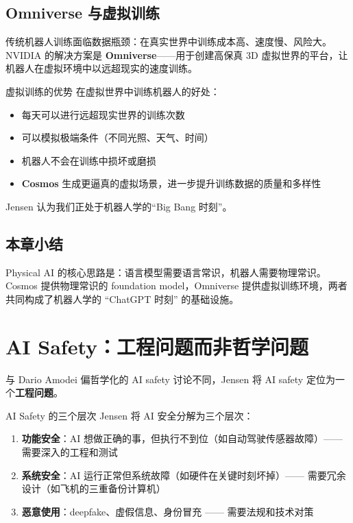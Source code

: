 \documentclass[a4paper]{article}
\begin{document}
\subsection{Omniverse 与虚拟训练}

传统机器人训练面临数据瓶颈：在真实世界中训练成本高、速度慢、风险大。NVIDIA 的解决方案是 \textbf{Omniverse}——用于创建高保真 3D 虚拟世界的平台，让机器人在虚拟环境中以远超现实的速度训练。

\begin{knowledgebox}{虚拟训练的优势}
在虚拟世界中训练机器人的好处：
\begin{itemize}
    \item 每天可以进行远超现实世界的训练次数
    \item 可以模拟极端条件（不同光照、天气、时间）
    \item 机器人不会在训练中损坏或磨损
    \item \textbf{Cosmos} 生成更逼真的虚拟场景，进一步提升训练数据的质量和多样性
\end{itemize}
Jensen 认为我们正处于机器人学的``Big Bang 时刻''。
\end{knowledgebox}

\subsection{本章小结}
Physical AI 的核心思路是：语言模型需要语言常识，机器人需要物理常识。Cosmos 提供物理常识的 foundation model，Omniverse 提供虚拟训练环境，两者共同构成了机器人学的 ``ChatGPT 时刻'' 的基础设施。

\section{AI Safety：工程问题而非哲学问题}

与 Dario Amodei 偏哲学化的 AI safety 讨论不同，Jensen 将 AI safety 定位为一个\textbf{工程问题}。

\begin{importantbox}{AI Safety 的三个层次}
Jensen 将 AI 安全分解为三个层次：
\begin{enumerate}
    \item \textbf{功能安全}：AI 想做正确的事，但执行不到位（如自动驾驶传感器故障）—— 需要深入的工程和测试
    \item \textbf{系统安全}：AI 运行正常但系统故障（如硬件在关键时刻坏掉）—— 需要冗余设计（如飞机的三重备份计算机）
    \item \textbf{恶意使用}：deepfake、虚假信息、身份冒充 —— 需要法规和技术对策
\end{enumerate}
\end{importantbox}
\end{document}
